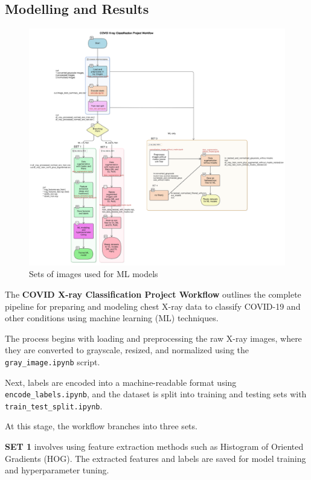 \documentclass{article}
\begin{document}
\subsection{Modelling and Results}
\begin{figure}%
    \centering
    \includegraphics[width=1.0\linewidth]{diagram-export-5-8-2025-4_05_06-PM.png}
    \caption{Sets of images used for ML models}
    \label{fig:WORKFLOW}
\end{figure}
The \textbf{COVID X-ray Classification Project Workflow} outlines the complete pipeline for preparing and modeling chest X-ray data to classify COVID-19 and other conditions using machine learning (ML) techniques.

The process begins with loading and preprocessing the raw X-ray images, where they are converted to grayscale, resized, and normalized using the \texttt{gray\_image.ipynb} script.

Next, labels are encoded into a machine-readable format using \texttt{encode\_labels.ipynb}, and the dataset is split into training and testing sets with \texttt{train\_test\_split.ipynb}.

At this stage, the workflow branches into three sets.

\textbf{SET 1} involves using feature extraction methods such as Histogram of Oriented Gradients (HOG). The extracted features and labels are saved for model training and hyperparameter tuning.
\end{document}
